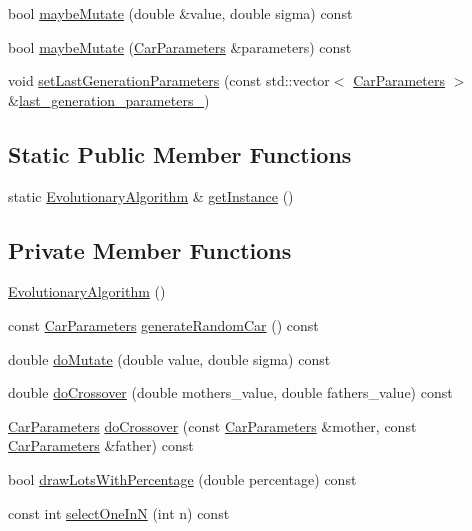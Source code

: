 \begin{DoxyCompactItemize}
\item 
bool \hyperlink{classEvolutionaryAlgorithm_a19c58cc0434d314fb5378e3674546988}{maybe\+Mutate} (double \&value, double sigma) const
\item 
bool \hyperlink{classEvolutionaryAlgorithm_ac144c241688bbe9a50c7ce98f6895ba2}{maybe\+Mutate} (\hyperlink{classCarParameters}{Car\+Parameters} \&parameters) const
\item 
void \hyperlink{classEvolutionaryAlgorithm_accd59515cc111edb66a030e7f8d79099}{set\+Last\+Generation\+Parameters} (const std\+::vector$<$ \hyperlink{classCarParameters}{Car\+Parameters} $>$ \&\hyperlink{classEvolutionaryAlgorithm_a85d23b07f2b2c8b1df581a9566111fa7}{last\+\_\+generation\+\_\+parameters\+\_\+})
\end{DoxyCompactItemize}
\subsection*{Static Public Member Functions}
\begin{DoxyCompactItemize}
\item 
static \hyperlink{classEvolutionaryAlgorithm}{Evolutionary\+Algorithm} \& \hyperlink{classEvolutionaryAlgorithm_a306ea15ca9a4eb67b84d22c7b24ef659}{get\+Instance} ()
\end{DoxyCompactItemize}
\subsection*{Private Member Functions}
\begin{DoxyCompactItemize}
\item 
\hyperlink{classEvolutionaryAlgorithm_a7a37fb1cdb3f585529af74dec4d0bf8d}{Evolutionary\+Algorithm} ()
\item 
const \hyperlink{classCarParameters}{Car\+Parameters} \hyperlink{classEvolutionaryAlgorithm_a4f36e597080d9822c36837c8a582d4d0}{generate\+Random\+Car} () const
\item 
double \hyperlink{classEvolutionaryAlgorithm_a02a05f75707440141d9ec3129cadc681}{do\+Mutate} (double value, double sigma) const
\item 
double \hyperlink{classEvolutionaryAlgorithm_a1f0c3d66b8abfdcdf6eedf065580cef6}{do\+Crossover} (double mothers\+\_\+value, double fathers\+\_\+value) const
\item 
\hyperlink{classCarParameters}{Car\+Parameters} \hyperlink{classEvolutionaryAlgorithm_a387fba63cd849a74652c6de1beb82318}{do\+Crossover} (const \hyperlink{classCarParameters}{Car\+Parameters} \&mother, const \hyperlink{classCarParameters}{Car\+Parameters} \&father) const
\item 
bool \hyperlink{classEvolutionaryAlgorithm_a20aec1049a8837cddef2305259450fe3}{draw\+Lots\+With\+Percentage} (double percentage) const
\item 
const int \hyperlink{classEvolutionaryAlgorithm_a8efaa380f6d1b9a2f8a6ad44e2d362e2}{select\+One\+InN} (int n) const
\end{DoxyCompactItemize}

